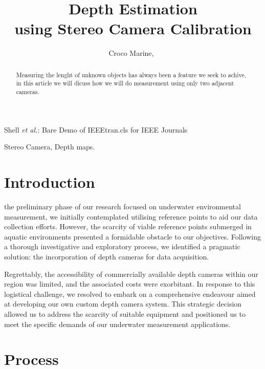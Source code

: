 \documentclass[journal]{IEEEtran}
\begin{document}
		
		\title{Depth Estimation\\ {\Large using Stereo Camera Calibration}}
		\author{Croco Marine,~}
	
	
	
	{Shell \MakeLowercase{\textit{et al.}}: Bare Demo of IEEEtran.cls for IEEE Journals}
	\maketitle
	
	\begin{abstract}
		Measuring the lenght of unknown objects has always been a feature we seek to achive, in this article we will dicuss how we will do measurement using only two adjacent cameras.  
	\end{abstract}
	
	\begin{IEEEkeywords}
		Stereo Camera, Depth maps.
	\end{IEEEkeywords}
	
	
	\IEEEpeerreviewmaketitle
	
	
	\section{Introduction}
	 the preliminary phase of our research focused on underwater environmental measurement, we initially contemplated utilising reference points to aid our data collection efforts. However, the scarcity of viable reference points submerged in aquatic environments presented a formidable obstacle to our objectives. Following a thorough investigative and exploratory process, we identified a pragmatic solution: the incorporation of depth cameras for data acquisition.
	
	Regrettably, the accessibility of commercially available depth cameras within our region was limited, and the associated costs were exorbitant. In response to this logistical challenge, we resolved to embark on a comprehensive endeavour aimed at developing our own custom depth camera system. This strategic decision allowed us to address the scarcity of suitable equipment and positioned us to meet the specific demands of our underwater measurement applications.
	
	\section{Process}
\end{document}
